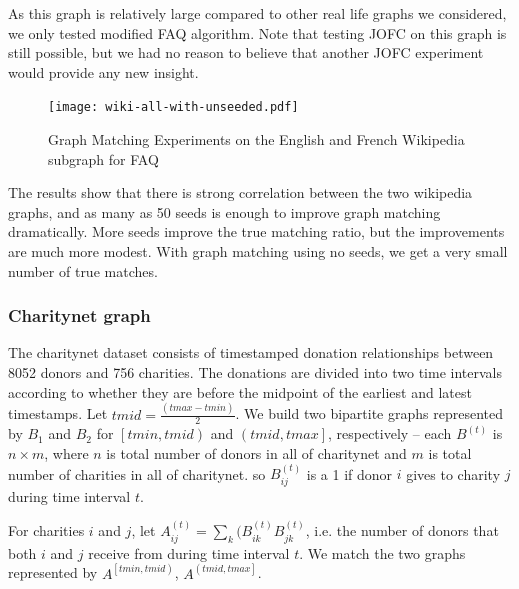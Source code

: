 \documentclass[12pt,oneside,final]{thesis}\usepackage[]{graphicx}\usepackage[]{color}
\begin{document}
 As this graph is relatively large compared to other real life graphs we considered, we only tested modified FAQ algorithm. Note that testing JOFC on this graph is still possible, but we had no reason to believe that another JOFC experiment would provide any new insight.

\begin{figure}
\texttt{[image: wiki-all-with-unseeded.pdf]}
\caption{Graph Matching Experiments on the English and French Wikipedia subgraph for FAQ \label{wiki_graphmatch}}
\end{figure}

The results show that there is strong correlation between the two wikipedia graphs, and as many as 50 seeds is enough to improve graph matching dramatically. More seeds improve the true matching ratio,  but the improvements are much more modest. With graph matching using no seeds, we get a very small number of  true matches. 
      
\subsubsection{Charitynet graph}

The charitynet dataset consists  of timestamped donation relationships between 8052 donors and 756 charities. The donations are divided into two time intervals according to whether they are before the midpoint of the earliest and latest timestamps.
Let $tmid = \frac{(tmax - tmin)}{2}$.
We build two bipartite graphs represented by $B_1$ and $B_2$ for $\left[tmin,tmid\right)$ and $\left(tmid,tmax\right]$, respectively --
each $B^{(t)}$ is $n \times m$, where $n$ is total number of donors in all of charitynet and $m$ is total number of charities in all of charitynet.
so $B_{ij}^{(t)}$ is a 1 if donor $i$ gives to charity $j$ during time interval $t$.

For charities $i$ and $j$,
let $A_{ij}^{(t)}= \sum_{k}{(B_{ik}^{(t)}B_{jk}^{(t)}}$, i.e. the number of donors that both $i$ and $j$ receive from during time interval $t$.
We match the two graphs represented by  $A^{\left[ tmin,tmid \right)}$, $A^{\left(tmid,tmax\right]}$.
\end{document}
